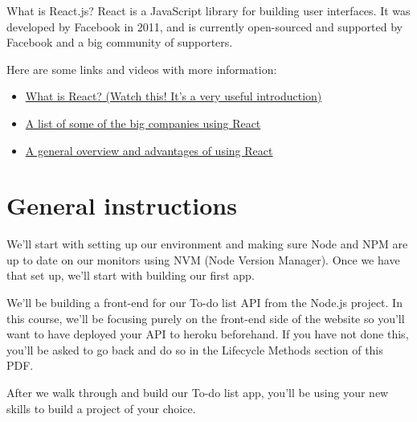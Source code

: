 \documentclass{42-en}
\begin{document}
What is React.js? React is a JavaScript library for building user interfaces. It was developed by Facebook in 2011, and is currently open-sourced and supported by Facebook and a big community of supporters.


Here are some links and videos with more information:
\begin{itemize}\itemsep1pt
\item \href{https://youtu.be/N3AkSS5hXMA}{What is React? (Watch this! It's a very useful introduction)}
\item \href{https://brainhub.eu/blog/10-famous-apps-using-reactjs-nowadays/}{A list of some of the big companies using React}
\item \href{https://medium.com/@hamzamahmood/advantages-of-developing-modern-web-apps-with-react-js-8504c571db71}{A general overview and advantages of using React}
\end{itemize}

\chapter{General instructions}

We'll start with setting up our environment and making sure Node and NPM are up to date on our monitors using NVM (Node Version Manager). Once we have that set up, we'll start with building our first app.

We'll be building a front-end for our To-do list API from the Node.js project. In this course, we'll be focusing purely on the front-end side of the website so you'll want to have deployed your API to heroku beforehand. If you have not done this, you'll be asked to go back and do so in the Lifecycle Methods section of this PDF.

After we walk through and build our To-do list app, you'll be using your new skills to build a project of your choice.

\startexercices
\end{document}
